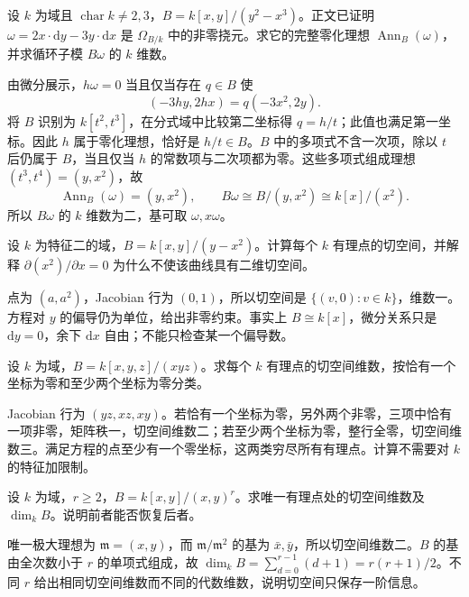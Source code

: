 \begin{exercise}\label{b3:ex:14-cusp-torsion}
	设 \(k\) 为域且 \(\operatorname{char}k\ne2,3\)，\(B=k[x,y]/(y^2-x^3)\)。正文已证明 \(\omega=2x\cdot\mathrm{d}y-3y\cdot\mathrm{d}x\) 是 \(\Omega_{B/k}\) 中的非零挠元。求它的完整零化理想 \(\operatorname{Ann}_B(\omega)\)，并求循环子模 \(B\omega\) 的 \(k\) 维数。
\end{exercise}
\begin{solution}
	由微分展示，\(h\omega=0\) 当且仅当存在 \(q\in B\) 使
	\[
		(-3hy,2hx)=q(-3x^2,2y).
	\]
	将 \(B\) 识别为 \(k[t^2,t^3]\)，在分式域中比较第二坐标得 \(q=h/t\)；此值也满足第一坐标。因此 \(h\) 属于零化理想，恰好是 \(h/t\in B\)。\(B\) 中的多项式不含一次项，除以 \(t\) 后仍属于 \(B\)，当且仅当 \(h\) 的常数项与二次项都为零。这些多项式组成理想 \((t^3,t^4)=(y,x^2)\)，故
	\[
		\operatorname{Ann}_B(\omega)=(y,x^2),\qquad B\omega\cong B/(y,x^2)\cong k[x]/(x^2).
	\]
	所以 \(B\omega\) 的 \(k\) 维数为二，基可取 \(\omega,x\omega\)。
\end{solution}

\begin{exercise}\label{b3:ex:14-parabola-characteristic-two}
	设 \(k\) 为特征二的域，\(B=k[x,y]/(y-x^2)\)。计算每个 \(k\) 有理点的切空间，并解释 \(\partial(x^2)/\partial x=0\) 为什么不使该曲线具有二维切空间。
\end{exercise}
\begin{solution}
	点为 \((a,a^2)\)，Jacobian 行为 \((0,1)\)，所以切空间是 \(\bigl\{(v,0):v\in k\bigr\}\)，维数一。方程对 \(y\) 的偏导仍为单位，给出非零约束。事实上 \(B\cong k[x]\)，微分关系只是 \(\mathrm{d}y=0\)，余下 \(\mathrm{d}x\) 自由；不能只检查某一个偏导数。
\end{solution}

\begin{exercise}\label{b3:ex:14-three-planes-tangent}
	设 \(k\) 为域，\(B=k[x,y,z]/(xyz)\)。求每个 \(k\) 有理点的切空间维数，按恰有一个坐标为零和至少两个坐标为零分类。
\end{exercise}
\begin{solution}
	Jacobian 行为 \((yz,xz,xy)\)。若恰有一个坐标为零，另外两个非零，三项中恰有一项非零，矩阵秩一，切空间维数二；若至少两个坐标为零，整行全零，切空间维数三。满足方程的点至少有一个零坐标，这两类穷尽所有有理点。计算不需要对 \(k\) 的特征加限制。
\end{solution}

\begin{exercise}\label{b3:ex:14-fat-point-tangent}
	设 \(k\) 为域，\(r\ge2\)，\(B=k[x,y]/(x,y)^r\)。求唯一有理点处的切空间维数及 \(\dim_kB\)。说明前者能否恢复后者。
\end{exercise}
\begin{solution}
	唯一极大理想为 \(\mathfrak m=(x,y)\)，而 \(\mathfrak m/\mathfrak m^2\) 的基为 \(\bar x,\bar y\)，所以切空间维数二。\(B\) 的基由全次数小于 \(r\) 的单项式组成，故 \(\dim_kB=\sum_{d=0}^{r-1}(d+1)=r(r+1)/2\)。不同 \(r\) 给出相同切空间维数而不同的代数维数，说明切空间只保存一阶信息。
\end{solution}

